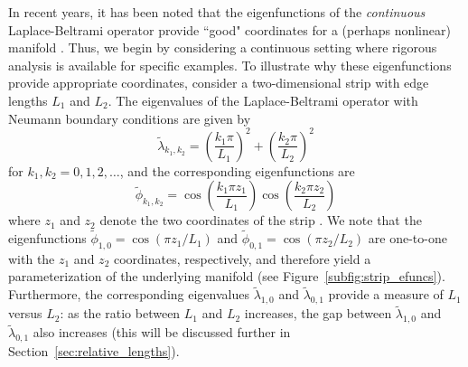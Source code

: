 In recent years, it has been noted that the eigenfunctions of the \emph{continuous} Laplace-Beltrami operator provide ``good" coordinates for a (perhaps nonlinear) manifold \cite{jones2008}.
%
Thus, we begin by considering a continuous setting where rigorous analysis is available for specific examples.
%
%
To illustrate why these eigenfunctions provide appropriate coordinates, consider a two-dimensional strip with edge lengths $L_1$ and $L_2$.
%
The eigenvalues of the Laplace-Beltrami operator with Neumann boundary conditions are given by
\begin{equation} \label{eq:evals}
\tilde{\lambda}_{k_1, k_2} = \left( \frac{k_1 \pi}{L_1} \right)^2 + \left( \frac{k_2 \pi}{L_2} \right)^2
\end{equation}
for $k_1, k_2 = 0, 1, 2, \dots$,
and the corresponding eigenfunctions are
\begin{equation} \label{eq:efuncs}
\tilde{\phi}_{k_1, k_2} = \cos \left( \frac{k_1 \pi z_1}{L_1} \right) \cos \left( \frac{k_2 \pi z_2}{L_2} \right)
\end{equation}
where $z_1$ and $z_2$ denote the two coordinates of the strip \cite{singer2008non}.
%
We note that the eigenfunctions $\tilde{\phi}_{1, 0} = \cos \left( {\pi z_1}/{L_1} \right)$ and $\tilde{\phi}_{0, 1} = \cos \left( {\pi z_2}/{L_2} \right)$ are one-to-one with the $z_1$ and $z_2$ coordinates, respectively, and therefore yield a parameterization of the underlying manifold (see Figure~\ref{subfig:strip_efuncs}).
%
Furthermore, the corresponding eigenvalues $\tilde{\lambda}_{1,0}$ and $\tilde{\lambda}_{0,1}$ provide a measure of $L_1$ versus $L_2$: as the ratio between $L_1$ and $L_2$ increases, the gap between $\tilde{\lambda}_{1,0}$ and $\tilde{\lambda}_{0,1}$ also increases (this will be discussed further in Section~\ref{sec:relative_lengths}).
%


